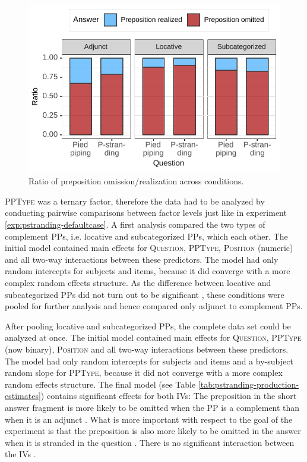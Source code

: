 \begin{figure}[t]
\includegraphics[scale=1]{figures/ex8_prod_relfrag_answers}
 \caption{Ratio of preposition omission/realization across conditions\label{fig:ex8_prod_fragments}.}
\end{figure}

\textsc{PPType} was a ternary factor, therefore the data had to be analyzed by conducting pairwise comparisons between factor levels just like in experiment \ref{exp:pstranding-defaultcase}. A first analysis compared the two types of complement PPs, i.e. locative and subcategorized PPs, which each other. The initial model contained main effects for \textsc{Question}, \textsc{PPType}, \textsc{Position} (numeric) and all two-way interactions between these predictors. The model had only random intercepts for subjects and items, because it did converge with a more complex random effects structure. As the difference between locative and subcategorized PPs did not turn out to be significant , these conditions were pooled for further analysis and hence compared only adjunct to complement PPs. 

After pooling locative and subcategorized PPs, the complete data set could be analyzed at once. 
The initial model contained main effects for \textsc{Question}, \textsc{PPType} (now binary), \textsc{Position} and all two-way interactions between these predictors. The model had only random intercepts for subjects and items and a by-subject random slope for \textsc{PPType}, because it did not converge with a more complex random effects structure. The final model (see Table \ref{tab:pstranding-production-estimates}) contains significant effects for both IVs: The preposition in the short answer fragment is more likely to be omitted when the PP is a complement than when it is an adjunct . What is more important with respect to the goal of the experiment is that the preposition is also more likely to be omitted in the answer when it is stranded in the question . There is no significant interaction between the IVs  .

